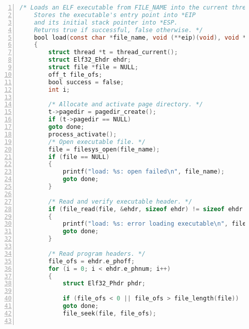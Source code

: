 \documentclass{article}
\begin{document}
	\begin{lstlisting}[xleftmargin = 4em,xrightmargin = 4em, aboveskip = 1em, numbers = left, language = C,title=src/userprog/process.c - load()]
    /* Loads an ELF executable from FILE_NAME into the current thread.
    Stores the executable's entry point into *EIP
    and its initial stack pointer into *ESP.
    Returns true if successful, false otherwise. */
    bool load(const char *file_name, void (**eip)(void), void **esp)
    {
        struct thread *t = thread_current();
        struct Elf32_Ehdr ehdr;
        struct file *file = NULL;
        off_t file_ofs;
        bool success = false;
        int i;
        
        /* Allocate and activate page directory. */
        t->pagedir = pagedir_create();
        if (t->pagedir == NULL)
        goto done;
        process_activate();
        /* Open executable file. */
        file = filesys_open(file_name);
        if (file == NULL)
        {
            printf("load: %s: open failed\n", file_name);
            goto done;
        }
        
        /* Read and verify executable header. */
        if (file_read(file, &ehdr, sizeof ehdr) != sizeof ehdr || memcmp(ehdr.e_ident, "\177ELF\1\1\1", 7) || ehdr.e_type != 2 || ehdr.e_machine != 3 || ehdr.e_version != 1 || ehdr.e_phentsize != sizeof(struct Elf32_Phdr) || ehdr.e_phnum > 1024)
        {
            printf("load: %s: error loading executable\n", file_name);
            goto done;
        }
        
        /* Read program headers. */
        file_ofs = ehdr.e_phoff;
        for (i = 0; i < ehdr.e_phnum; i++)
        {
            struct Elf32_Phdr phdr;
            
            if (file_ofs < 0 || file_ofs > file_length(file))
            goto done;
            file_seek(file, file_ofs);
            

\end{lstlisting}
\end{document}
